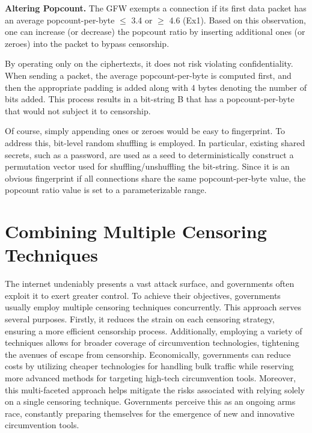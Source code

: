 \textbf{Altering Popcount.} The GFW exempts a connection if its first data packet has an average popcount-per-byte ${\leq}$ 3.4 or ${\geq}$ 4.6 (Ex1). Based on this observation, one can increase (or decrease) the popcount ratio by inserting additional ones (or zeroes) into the packet to bypass censorship.

By operating only on the ciphertexts, it does not risk violating confidentiality. When sending a packet, the average popcount-per-byte is computed first, and then the appropriate padding is added along with 4 bytes denoting the number of bits added. This process results in a bit-string B that has a popcount-per-byte that would not subject it to censorship.

Of course, simply appending ones or zeroes would be easy to fingerprint. To address this, bit-level random shuffling is employed. In particular, existing shared secrets, such as a password, are used as a seed to deterministically construct a permutation vector used for shuffling/unshuffling the bit-string. Since it is an obvious fingerprint if all connections share the same popcount-per-byte value, the popcount ratio value is set to a parameterizable range.

\section{Combining Multiple Censoring Techniques}
The internet undeniably presents a vast attack surface, and governments often exploit it to exert greater control. To achieve their objectives, governments usually employ multiple censoring techniques concurrently. This approach serves several purposes. Firstly, it reduces the strain on each censoring strategy, ensuring a more efficient censorship process. Additionally, employing a variety of techniques allows for broader coverage of circumvention technologies, tightening the avenues of escape from censorship. Economically, governments can reduce costs by utilizing cheaper technologies for handling bulk traffic while reserving more advanced methods for targeting high-tech circumvention tools. Moreover, this multi-faceted approach helps mitigate the risks associated with relying solely on a single censoring technique. Governments perceive this as an ongoing arms race, constantly preparing themselves for the emergence of new and innovative circumvention tools.

